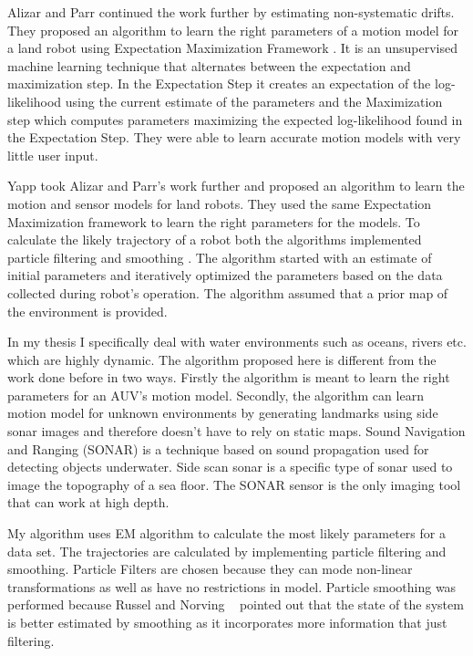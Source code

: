 \documentclass[12pt]{dalcsthesis}
\begin{document}
Alizar and Parr \cite{Eliazar2004} continued the work further by estimating non-systematic drifts.  They proposed an algorithm to learn the right parameters of a motion model for a land robot using Expectation Maximization Framework \cite{dempster1977maximum}. It is an unsupervised machine learning technique that alternates between the expectation and maximization step. In the Expectation Step it creates an expectation of the log-likelihood using the current estimate of the parameters and the Maximization step which computes parameters maximizing the expected log-likelihood found in the Expectation Step. They were able to learn accurate motion models with very little user input.

Yapp \cite{Yap2008} took Alizar and Parr's \cite{Eliazar2004} work further and proposed an algorithm to learn the motion and sensor models for land robots. They used the same Expectation Maximization framework to learn the right parameters for the models. To calculate the likely trajectory of a robot both the algorithms implemented particle filtering \cite{ristic2004beyond} \cite{chen2003bayesian} and smoothing \cite{doucet2000monte}.  The algorithm started with an estimate of initial parameters and iteratively optimized the parameters based on the data collected during robot's operation. The algorithm assumed that a prior map of the environment is provided. 

In my thesis I specifically deal with water environments such as oceans, rivers etc. which are highly dynamic.  The algorithm proposed here is different from the work done before in two ways. Firstly the algorithm is meant to learn the right parameters for an AUV's motion model. Secondly, the algorithm can learn motion model for unknown environments by generating landmarks using side sonar images and therefore doesn't have to rely on static maps. Sound Navigation and Ranging (SONAR) is a technique based on sound propagation used for detecting objects underwater. Side scan sonar is a specific type of sonar used to image the topography of a sea floor.  The SONAR sensor is the only imaging tool that can work at high depth. 

My algorithm uses EM algorithm to calculate the most likely parameters for a data set.  The trajectories are calculated by implementing particle filtering and smoothing.  Particle Filters are chosen because they can mode non-linear transformations as well as have no restrictions in model. Particle smoothing was performed because Russel and Norving ~\cite{russell2003artificial} pointed out that the state of the system is better estimated by smoothing as it incorporates more information that just filtering. 
\end{document}
